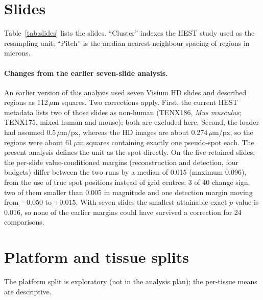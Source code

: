 \documentclass{article}
\begin{document}
\appendix

\section{Slides}
\label{app:slides}

Table~\ref{tab:slides} lists the slides. ``Cluster'' indexes the HEST study used as the resampling unit;
``Pitch'' is the median nearest-neighbour spacing of regions in microns.

\begin{table}[htbp]
\centering
\caption{The 22 slides (HEST-1k v1.3 metadata).}
\label{tab:slides}
\resizebox{\textwidth}{!}{}
\end{table}

\paragraph{Changes from the earlier seven-slide analysis.} An earlier version of this analysis used seven
Visium HD slides and described regions as 112\,$\mu$m squares. Two corrections apply. First, the current HEST
metadata lists two of those slides as non-human (TENX186, \emph{Mus musculus}; TENX175, mixed human and mouse);
both are excluded here. Second, the loader had assumed 0.5\,$\mu$m/px, whereas the HD images are about
0.274\,$\mu$m/px, so the regions were about 61\,$\mu$m squares containing exactly one pseudo-spot each. The
present analysis defines the unit as the spot directly. On the five retained slides, the per-slide
value-conditioned margins (reconstruction and detection, four budgets) differ between the two runs by a
median of 0.015 (maximum 0.096), from the use of true spot positions instead of grid centres; 3 of 40 change
sign, two of them smaller than 0.005 in magnitude and one detection margin moving from $-0.050$ to $+0.015$.
With seven slides the smallest attainable exact $p$-value is 0.016, so none of the earlier margins could have
survived a correction for 24 comparisons.

\section{Platform and tissue splits}
\label{app:split}

The platform split is exploratory (not in the analysis plan); the per-tissue means are descriptive.

\begin{table}[htbp]
\centering
\caption{Selected margins by platform (with unadjusted study-level sign-flip $p$) and by tissue (mean).
With 5 HD studies the smallest attainable $p$ is 0.0625.}
\label{tab:split}
\resizebox{\textwidth}{!}{}
\end{table}
\end{document}

